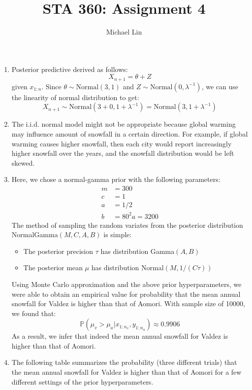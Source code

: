 \documentclass{article}
\title{STA 360: Assignment 4}
\author{Michael Lin}
\begin{document}
\maketitle

\begin{enumerate}
\item Posterior predictive derived as follows:
$$ X_{n+1} = \theta + Z $$
given $x_{1:n}$. Since $\theta\sim \text{Normal}(3,1)$ and $Z \sim \text{Normal}(0,\lambda^{-1})$, we can use the linearity of normal distribution to get:
$$ X_{n+1} \sim \text{Normal}(3+0, 1+\lambda^{-1}) = \text{Normal}(3, 1+\lambda^{-1}) $$

\setcounter{enumi}{2}

\item The i.i.d. normal model might not be appropriate because global warming may influence amount of snowfall in a certain direction. For example, if global warming causes higher snowfall, then each city would report increasingly higher snowfall over the years, and the snowfall distribution would be left skewed.

\item Here, we chose a normal-gamma prior with the following parameters:
\begin{align*}
m &= 300 \\
c &= 1 \\
a &= 1/2 \\
b &= 80^2a = 3200
\end{align*}
The method of sampling the random variates from the posterior distribution NormalGamma$(M, C, A, B)$ is simple:
\begin{itemize}
\item The posterior precision $\tau$ has distribution Gamma$(A,B)$
\item The posterior mean $\mu$ has distribution Normal$(M,1/(C\tau))$
\end{itemize}

Using Monte Carlo approximation and the above prior hyperparameters, we were able to obtain an empirical value for probability that the mean annual snowfall for Valdez is higher than that of Aomori. With sample size of 10000, we found that:
$$\mathds{P}(\mu_v > \mu_a | x_{1:n_v}, y_{1:n_a}) \approx 0.9906$$
As a result, we infer that indeed the mean annual snowfall for Valdez is higher than that of Aomori.

\item The following table summarizes the probability (three different trials) that the mean annual snowfall for Valdez is higher than that of Aomori for a few different settings of the prior hyperparameters.


\end{enumerate}
\end{document}
